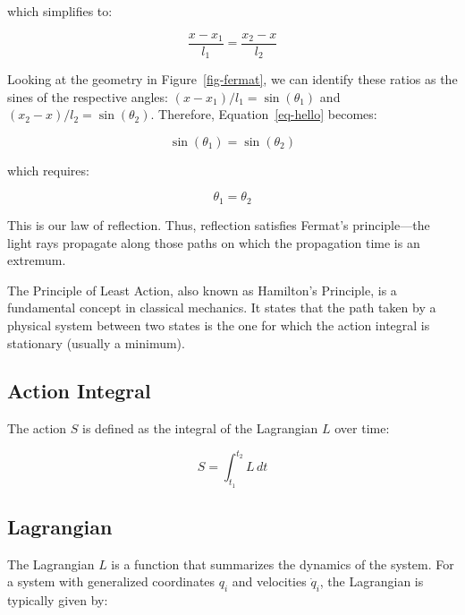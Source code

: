 \documentclass[
  a4paper,
]{book}
\begin{document}
which simplifies to:

\[
\frac{x-x_1}{l_1}=\frac{x_2-x}{l_2}
\]

Looking at the geometry in Figure~\ref{fig-fermat}, we can identify
these ratios as the sines of the respective angles:
\((x-x_1)/l_1 = \sin(\theta_1)\) and \((x_2-x)/l_2 = \sin(\theta_2)\).
Therefore, Equation~\ref{eq-hello} becomes:

\[
\sin(\theta_1)=\sin(\theta_2)
\]

which requires:

\[
\theta_1=\theta_2
\]

This is our law of reflection. Thus, reflection satisfies Fermat's
principle---the light rays propagate along those paths on which the
propagation time is an extremum.

\begin{tcolorbox}[enhanced jigsaw, breakable, toptitle=1mm, bottomrule=.15mm, colbacktitle=quarto-callout-tip-color!10!white, title=\textcolor{quarto-callout-tip-color}{\faLightbulb}\hspace{0.5em}{Principle of Least Action (Hamilton's Principle)}, arc=.35mm, rightrule=.15mm, bottomtitle=1mm, opacityback=0, toprule=.15mm, coltitle=black, leftrule=.75mm, opacitybacktitle=0.6, colback=white, left=2mm, titlerule=0mm, colframe=quarto-callout-tip-color-frame]

The Principle of Least Action, also known as Hamilton's Principle, is a
fundamental concept in classical mechanics. It states that the path
taken by a physical system between two states is the one for which the
action integral is stationary (usually a minimum).

\subsection{Action Integral}\label{action-integral}

The action \(S\) is defined as the integral of the Lagrangian \(L\) over
time:

\[
S = \int_{t_1}^{t_2} L \, dt
\]

\subsection{Lagrangian}\label{lagrangian}

The Lagrangian \(L\) is a function that summarizes the dynamics of the
system. For a system with generalized coordinates \(q_i\) and velocities
\(\dot{q}_i\), the Lagrangian is typically given by:


\end{tcolorbox}
\end{document}
